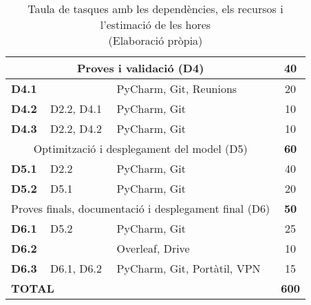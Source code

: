 {{\begin{table}[H]
\begin{tabular}{|cllc|}
                                              \multicolumn{3}{|c|}{Proves i validació (D4)}                                       & \textbf{40}              \\ \hline
\multicolumn{1}{|l|}{\textbf{D4.1}}         & \multicolumn{1}{l|}{}                      & \multicolumn{1}{l|}{PyCharm, Git, Reunions}                  & 20                       \\ \hline
\multicolumn{1}{|l|}{\textbf{D4.2}}         & \multicolumn{1}{l|}{D2.2, D4.1}                      & \multicolumn{1}{l|}{PyCharm, Git}        & 10                       \\ \hline
\multicolumn{1}{|l|}{\textbf{D4.3}}         & \multicolumn{1}{l|}{D2.2, D4.2}                      & \multicolumn{1}{l|}{PyCharm, Git}        & 10                       \\ \hline
                                              \multicolumn{3}{|c|}{Optimització i desplegament del model (D5)}                    & \textbf{60}              \\ \hline
\multicolumn{1}{|l|}{\textbf{D5.1}}         & \multicolumn{1}{l|}{D2.2}                      & \multicolumn{1}{l|}{PyCharm, Git}              & 40                       \\ \hline
\multicolumn{1}{|l|}{\textbf{D5.2}}         & \multicolumn{1}{l|}{D5.1}                      & \multicolumn{1}{l|}{PyCharm, Git}              & 20                       \\ \hline
                                              \multicolumn{3}{|c|}{Proves finals, documentació i desplegament final (D6)}                & \textbf{50}              \\ \hline
\multicolumn{1}{|l|}{\textbf{D6.1}}         & \multicolumn{1}{l|}{D5.2}                      & \multicolumn{1}{l|}{PyCharm, Git}              & 25                       \\ \hline
\multicolumn{1}{|l|}{\textbf{D6.2}}         & \multicolumn{1}{l|}{}                      & \multicolumn{1}{l|}{Overleaf, Drive}                  & 10                       \\ \hline
\multicolumn{1}{|l|}{\textbf{D6.3}}         & \multicolumn{1}{l|}{D6.1, D6.2}                      & \multicolumn{1}{l|}{PyCharm, Git, Portàtil, VPN}        & 15                       \\ \hline
\hline
\multicolumn{3}{|l|}{\textbf{TOTAL}}                & \textbf{600}              \\ \hline
\end{tabular}
\caption[Taula de tasques]{Taula de tasques amb les dependències, els recursos i l'estimació de les hores \\ (Elaboració pròpia)}
\label{fig:taula_tasques}
\end{table}

}
}